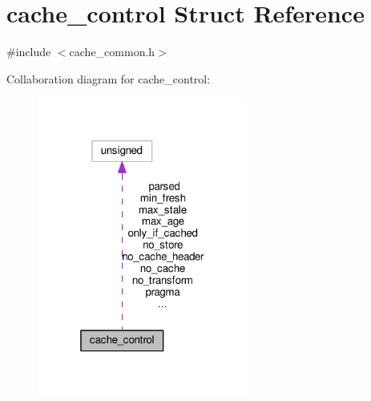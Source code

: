 \hypertarget{structcache__control}{}\section{cache\+\_\+control Struct Reference}
\label{structcache__control}


{\ttfamily \#include $<$cache\+\_\+common.\+h$>$}



Collaboration diagram for cache\+\_\+control\+:
\nopagebreak
\begin{figure}[H]
\begin{center}
\leavevmode
\includegraphics[width=196pt]{structcache__control__coll__graph}
\end{center}
\end{figure}
